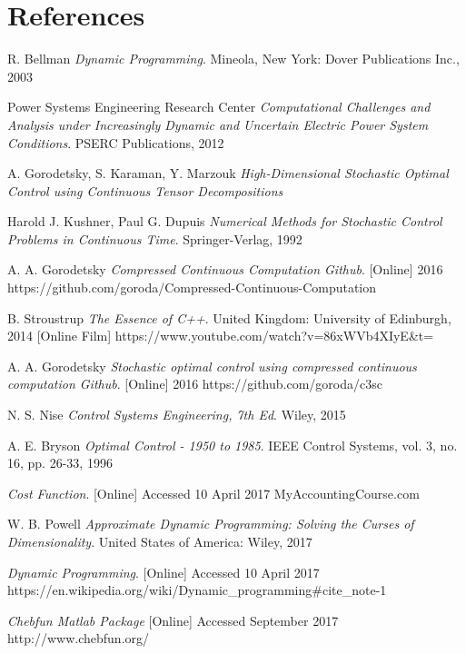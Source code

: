 \documentclass[11pt,draftd]{article}
\begin{document}
\section{References}
\begin{thebibliography}{9}
	R. Bellman
	\textit{Dynamic Programming}. 
	Mineola, New York: Dover Publications Inc., 2003
	
	Power Systems Engineering Research Center
	\textit{Computational Challenges and Analysis under Increasingly Dynamic and Uncertain Electric Power System Conditions}.
	PSERC Publications, 2012
	
	A. Gorodetsky, S. Karaman, Y. Marzouk
	\textit{High-Dimensional Stochastic Optimal Control using Continuous Tensor Decompositions}
	
	Harold J. Kushner, Paul G. Dupuis
	\textit{Numerical Methods for Stochastic Control Problems in Continuous Time}.
	Springer-Verlag, 1992	
	
	A. A. Gorodetsky
	\textit{Compressed Continuous Computation Github}.
	[Online] 2016
	https://github.com/goroda/Compressed-Continuous-Computation
	
	B. Stroustrup
	\textit{The Essence of C++}.
	United Kingdom: University of Edinburgh, 2014
	[Online Film] https://www.youtube.com/watch?v=86xWVb4XIyE\&t=
	
	A. A. Gorodetsky
	\textit{Stochastic optimal control using compressed continuous computation Github}.
	[Online] 2016
	https://github.com/goroda/c3sc
	
	N. S. Nise
	\textit{Control Systems Engineering, 7th Ed}.
	Wiley, 2015
	
	A. E. Bryson 
	\textit{Optimal Control - 1950 to 1985}.
	IEEE Control Systems, vol. 3, no. 16, pp. 26-33, 1996
	
	\textit{Cost Function}.
	[Online] Accessed 10 April 2017
	MyAccountingCourse.com
	
	W. B. Powell
	\textit{Approximate Dynamic Programming: Solving the Curses of Dimensionality}.
	United States of America: Wiley, 2017
	
	\textit{Dynamic Programming}.
	[Online] Accessed 10 April 2017
	https://en.wikipedia.org/wiki/Dynamic\_programming\#cite\_note-1
	
	\textit{Chebfun Matlab Package}
	[Online] Accessed September 2017
	http://www.chebfun.org/
	

\end{thebibliography}
\end{document}
